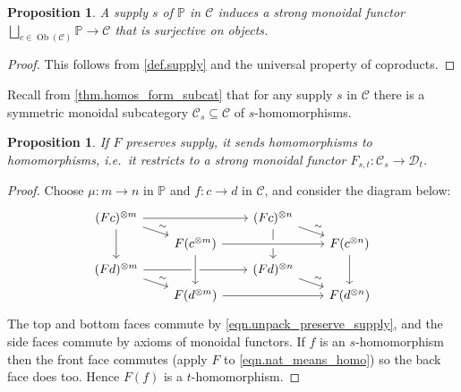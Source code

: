 \documentclass[11pt, oneside, article]{memoir}
\theoremstyle{plain}
\newtheorem{proposition}[theorem]{Proposition}
\theoremstyle{definition}
\theoremstyle{remark}
\newcommand{\Set}[1]{\mathrm{#1}}%
\newcommand{\cat}[1]{\mathcal{#1}}%
\DeclareMathOperator{\ob}{\Set{Ob}}
\newcommand{\tpow}[1]{^{\otimes #1}}
\newcommand{\pp}{\mathbb{P}}
\renewcommand{\ss}{\subseteq}
\begin{document}
\begin{proposition}
A supply $s$ of $\pp$ in $\cat{C}$ induces a strong monoidal functor $\bigsqcup_{c\in\ob(\cat{C})}\pp\to\cat{C}$ that is surjective on objects.
\end{proposition}
\begin{proof}
This follows from \cref{def.supply} and the universal property of coproducts.
\end{proof}




Recall from \cref{thm.homos_form_subcat} that for any supply $s$ in $\cat{C}$ there is a symmetric monoidal subcategory $\cat{C}_s\ss\cat{C}$ of $s$-homomorphisms.

\begin{proposition}
If $F$ preserves supply, it sends homomorphisms to homomorphisms, i.e.\ it restricts to a strong monoidal functor $F_{s,t}\colon\cat{C}_s\to\cat{D}_t$.
\end{proposition}
\begin{proof}
Choose $\mu\colon m\to n$ in $\pp$ and $f\colon c\to d$ in $\cat{C}$, and consider the diagram below:
\[
\begin{tikzcd}[row sep=3pt, column sep=20pt]
	(Fc)\tpow{m}\ar[rr]\ar[dd]\ar[dr, "\sim"]&&
	(Fc)\tpow{n}\ar[dr, "\sim"]\ar[dd]\\&
	F(c\tpow{m})\ar[rr, crossing over]&&
	F(c\tpow{n})\ar[dd]\\
	(Fd)\tpow{m}\ar[rr]\ar[dr, "\sim"]&&
	(Fd)\tpow{n}\ar[dr, "\sim"]\\&
	F(d\tpow{m})\ar[from=uu, crossing over]\ar[rr]&&
	F(d\tpow{n})
\end{tikzcd}
\]
The top and bottom faces commute by \cref{eqn.unpack_preserve_supply}, and the side faces commute by axioms of monoidal functors. If $f$ is an $s$-homomorphism then the front face commutes (apply $F$ to \eqref{eqn.nat_means_homo}) so the back face does too. Hence $F(f)$ is a $t$-homomorphism.
\end{proof}
\end{document}
